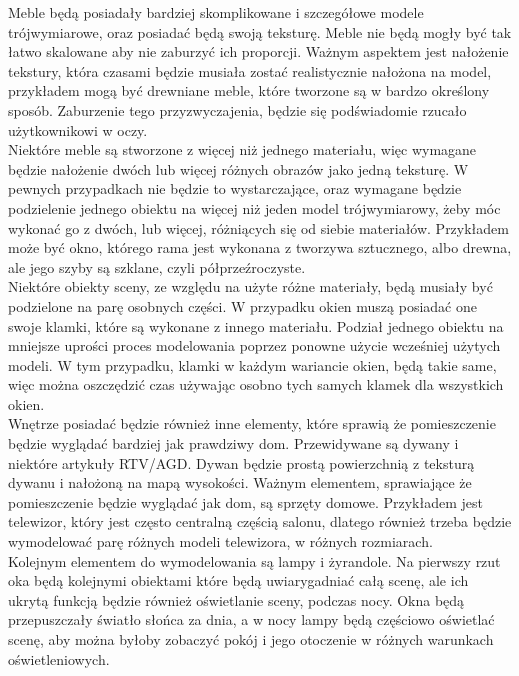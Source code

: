 \documentclass{article} %
\begin{document}
            Meble będą posiadały bardziej skomplikowane i szczegółowe modele trójwymiarowe, oraz posiadać będą swoją teksturę. Meble nie będą mogły być tak łatwo skalowane aby nie zaburzyć ich proporcji. Ważnym aspektem jest nałożenie tekstury, która czasami będzie musiała zostać realistycznie nałożona na model, przykładem mogą być drewniane meble, które tworzone są w bardzo określony sposób. Zaburzenie tego przyzwyczajenia, będzie się podświadomie rzucało użytkownikowi w oczy.
            \\
            
            Niektóre meble są stworzone z więcej niż jednego materiału, więc wymagane będzie nałożenie dwóch lub więcej różnych obrazów jako jedną teksturę. W pewnych przypadkach nie będzie to wystarczające, oraz wymagane będzie podzielenie jednego obiektu na więcej niż jeden model trójwymiarowy, żeby móc wykonać go z dwóch, lub więcej, różniących się od siebie materiałów. Przykładem może być okno, którego rama jest wykonana z tworzywa sztucznego, albo drewna, ale jego szyby są szklane, czyli półprzeźroczyste.
            \\
            
            Niektóre obiekty sceny, ze względu na użyte różne materiały, będą musiały być podzielone na parę osobnych części. W przypadku okien muszą posiadać one swoje klamki, które są wykonane z innego materiału. Podział jednego obiektu na mniejsze uprości proces modelowania poprzez ponowne użycie wcześniej użytych modeli. W tym przypadku, klamki w każdym wariancie okien, będą takie same, więc można oszczędzić czas używając osobno tych samych klamek dla wszystkich okien.
            \\
            
            Wnętrze posiadać będzie również inne elementy, które sprawią że pomieszczenie będzie wyglądać bardziej jak prawdziwy dom. Przewidywane są dywany i niektóre artykuły RTV/AGD. Dywan będzie prostą powierzchnią z teksturą dywanu i nałożoną na mapą wysokości. Ważnym elementem, sprawiające że pomieszczenie będzie wyglądać jak dom, są sprzęty domowe. Przykładem jest telewizor, który jest często centralną częścią salonu, dlatego również trzeba będzie wymodelować parę różnych modeli telewizora, w różnych rozmiarach. 
            \\
            
            Kolejnym elementem do wymodelowania są lampy i żyrandole. Na pierwszy rzut oka będą kolejnymi obiektami które będą uwiarygadniać całą scenę, ale ich ukrytą funkcją będzie również oświetlanie sceny, podczas nocy. Okna będą przepuszczały światło słońca za dnia, a w nocy lampy będą częściowo oświetlać scenę, aby można byłoby zobaczyć pokój i jego otoczenie w różnych warunkach oświetleniowych.
            \\
            
\end{document}
